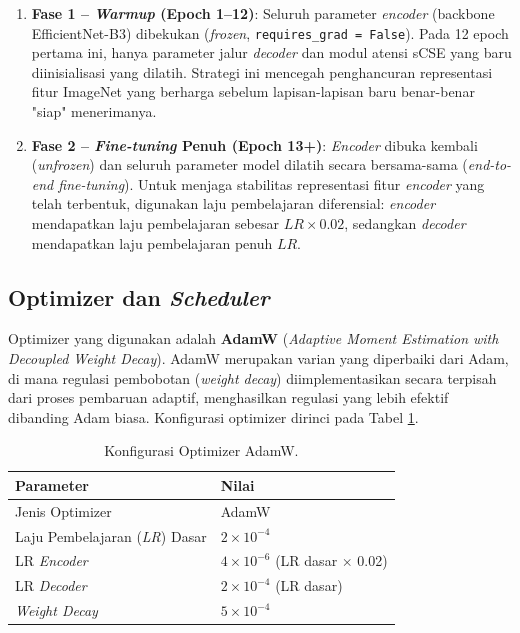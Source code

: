 \documentclass[12pt,a4paper,oneside]{book}
\begin{document}
\begin{enumerate}
  \item \textbf{Fase 1 -- \textit{Warmup} (Epoch 1--12)}: Seluruh parameter \textit{encoder} (backbone EfficientNet-B3) dibekukan (\textit{frozen}, \texttt{requires\_grad = False}). Pada 12 epoch pertama ini, hanya parameter jalur \textit{decoder} dan modul atensi sCSE yang baru diinisialisasi yang dilatih. Strategi ini mencegah penghancuran representasi fitur ImageNet yang berharga sebelum lapisan-lapisan baru benar-benar "siap" menerimanya.
  \item \textbf{Fase 2 -- \textit{Fine-tuning} Penuh (Epoch 13+)}: \textit{Encoder} dibuka kembali (\textit{unfrozen}) dan seluruh parameter model dilatih secara bersama-sama (\textit{end-to-end fine-tuning}). Untuk menjaga stabilitas representasi fitur \textit{encoder} yang telah terbentuk, digunakan laju pembelajaran diferensial: \textit{encoder} mendapatkan laju pembelajaran sebesar $\textit{LR} \times 0.02$, sedangkan \textit{decoder} mendapatkan laju pembelajaran penuh $\textit{LR}$.
\end{enumerate}

\subsection{Optimizer dan \textit{Scheduler}}

Optimizer yang digunakan adalah \textbf{AdamW} (\textit{Adaptive Moment Estimation with Decoupled Weight Decay}). AdamW merupakan varian yang diperbaiki dari Adam, di mana regulasi pembobotan (\textit{weight decay}) diimplementasikan secara terpisah dari proses pembaruan adaptif, menghasilkan regulasi yang lebih efektif dibanding Adam biasa. Konfigurasi optimizer dirinci pada Tabel \ref{tab:optimizer}.

\begin{table}[H]
  \centering
  \caption{Konfigurasi Optimizer AdamW.}
  \label{tab:optimizer}
  \begin{tabular}{l l}
    \toprule
    \textbf{Parameter} & \textbf{Nilai} \\
    \midrule
    Jenis Optimizer         & AdamW \\
    Laju Pembelajaran (\textit{LR}) Dasar & $2 \times 10^{-4}$ \\
    LR \textit{Encoder}     & $4 \times 10^{-6}$ (LR dasar $\times$ 0.02) \\
    LR \textit{Decoder}     & $2 \times 10^{-4}$ (LR dasar) \\
    \textit{Weight Decay}   & $5 \times 10^{-4}$ \\
    \bottomrule
  \end{tabular}
\end{table}
\end{document}

